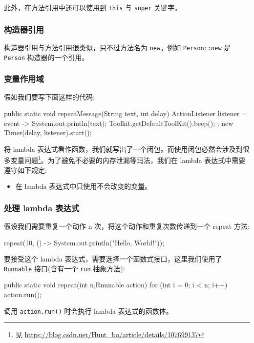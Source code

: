 此外，在方法引用中还可以使用到 \texttt{this} 与 \texttt{super} 关键字。

\subsubsection{构造器引用}

构造器引用与方法引用很类似，只不过方法名为 \texttt{new}。例如 \texttt{Person::new} 是 \texttt{Person} 构造器的一个引用。

\subsubsection{变量作用域}

假如我们要写下面这样的代码:
\begin{Java}
public static void repeatMessage(String text, int delay) {
    ActionListener listener = event -> {
        System.out.println(text);
        Toolkit.getDefaultToolKit().beep();
    };
    new Timer(delay, listener).start();
}
\end{Java}

将 lambda 表达式看作函数，我们就写出了一个闭包。而使用闭包必然会涉及到很多变量问题\footnote{见 \url{https://blog.csdn.net/Hunt_bo/article/details/107699137}}。为了避免不必要的内存泄漏等玛法，我们在 lambda 表达式中需要遵守如下规定:

\begin{itemize}
    \item 在 lambda 表达式中只使用不会改变的变量。
\end{itemize}

\subsubsection{处理 lambda 表达式}

假设我们需要重复一个动作 n 次，将这个动作和重复次数传递到一个 repeat 方法:
\begin{Java}
repeat(10, () -> System.out.println("Hello, World!"));
\end{Java}

要接受这个 lambda 表达式，需要选择一个函数式接口，这里我们使用了 \texttt{Runnable} 接口(含有一个 \texttt{run} 抽象方法):

\begin{Java}
public static void repeat(int n,Runnable action) {
    for (int i = 0; i < n; i++) action.run();
}
\end{Java}

调用 \texttt{action.run()} 时会执行 lambda 表达式的函数体。

